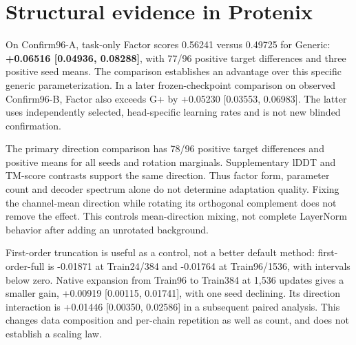 \section{Structural evidence in Protenix}
\label{sec:4}
On Confirm96-A, task-only Factor scores 0.56241 versus 0.49725 for Generic:
\textbf{+0.06516 {[}0.04936, 0.08288{]}}, with 77/96 positive target differences and
three positive seed means. The comparison establishes an advantage over this
specific generic parameterization. In a later frozen-checkpoint comparison
on observed Confirm96-B, Factor also exceeds G+ by
+0.05230 {[}0.03553, 0.06983{]}. The latter uses independently selected,
head-specific learning rates and is not new blinded confirmation.



The primary direction comparison has 78/96 positive target differences and
positive means for all seeds and rotation marginals. Supplementary lDDT and
TM-score contrasts support the same direction. Thus factor form, parameter
count and decoder spectrum alone do not determine adaptation quality.
Fixing the channel-mean direction while rotating its orthogonal complement
does not remove the effect. This controls mean-direction mixing, not complete
LayerNorm behavior after adding an unrotated background.

First-order truncation is useful as a control, not a better default method:
first-order-full is -0.01871 at Train24/384 and -0.01764 at Train96/1536,
with intervals below zero. Native expansion from Train96 to Train384 at
1,536 updates gives a smaller gain, +0.00919 {[}0.00115, 0.01741{]}, with one
seed declining. Its direction interaction is +0.01446 {[}0.00350, 0.02586{]}
in a subsequent paired analysis. This changes data composition and per-chain
repetition as well as count, and does not establish a scaling law.
